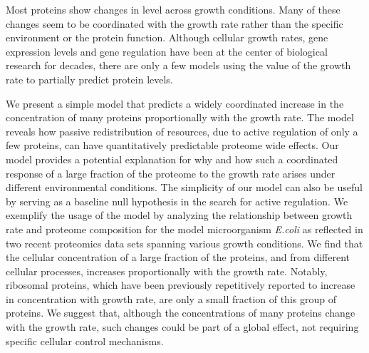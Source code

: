 Most proteins show changes in level across growth conditions.
Many of these changes seem to be coordinated with the growth rate rather than the specific environment or the protein function.
Although cellular growth rates, gene expression levels and gene regulation have been at the center of biological research for decades, there are only a few models using the value of the growth rate to partially predict protein levels.

We present a simple model that predicts a widely coordinated increase in the concentration of many proteins proportionally with the growth rate.
The model reveals how passive redistribution of resources, due to active regulation of only a few proteins, can have quantitatively predictable proteome wide effects.
Our model provides a potential explanation for why and how such a coordinated response of a large fraction of the proteome to the growth rate arises under different environmental conditions.
The simplicity of our model can also be useful by serving as a baseline null hypothesis in the search for active regulation.
We exemplify the usage of the model by analyzing the relationship between growth rate and proteome composition for the model microorganism \emph{E.coli} as reflected in two recent proteomics data sets spanning various growth conditions.
We find that the cellular concentration of a large fraction of the proteins, and from different cellular processes, increases proportionally with the growth rate.
Notably, ribosomal proteins, which have been previously repetitively reported to increase in concentration with growth rate, are only a small fraction of this group of proteins.
We suggest that, although the concentrations of many proteins change with the growth rate, such changes could be part of a global effect, not requiring specific cellular control mechanisms.